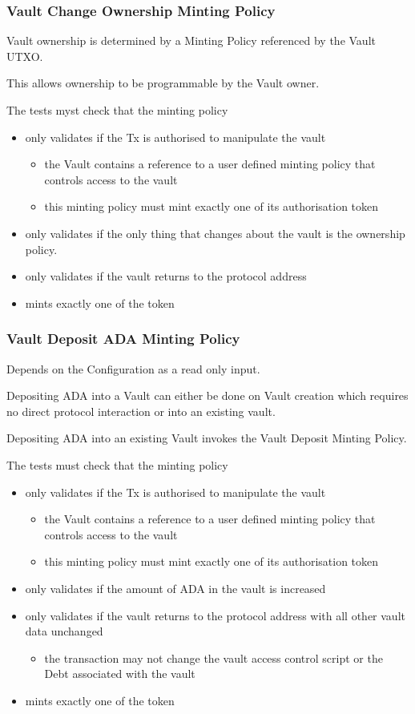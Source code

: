 \documentclass{article} %
\begin{document}
\subsubsection{Vault Change Ownership Minting Policy}
Vault ownership is determined by a Minting Policy referenced by the Vault UTXO.

This allows ownership to be programmable by the Vault owner.

The tests myst check that the minting policy
\begin{itemize}
  \item only validates if the Tx is authorised to manipulate the vault
  \begin{itemize}
    \item the Vault contains a reference to a user defined minting policy that controls access to the vault
    \item this minting policy must mint exactly one of its authorisation token
  \end{itemize}
  \item only validates if the only thing that changes about the vault is the ownership policy.
  \item only validates if the vault returns to the protocol address
  \item mints exactly one of the token
\end{itemize}

\subsubsection{Vault Deposit ADA Minting Policy}
Depends on the Configuration as a read only input.

Depositing ADA into a Vault can either be done on Vault creation which requires no direct protocol interaction or into an existing vault.

Depositing ADA into an existing Vault invokes the Vault Deposit Minting Policy.

The tests must check that the minting policy
\begin{itemize}
  \item only validates if the Tx is authorised to manipulate the vault
  \begin{itemize}
    \item the Vault contains a reference to a user defined minting policy that controls access to the vault
    \item this minting policy must mint exactly one of its authorisation token
  \end{itemize}
  \item only validates if the amount of ADA in the vault is increased
  \item only validates if the vault returns to the protocol address with all other vault data unchanged
  \begin{itemize}
    \item the transaction may not change the vault access control script or the Debt associated with the vault
  \end{itemize}
  \item mints exactly one of the token
\end{itemize}
\end{document}
